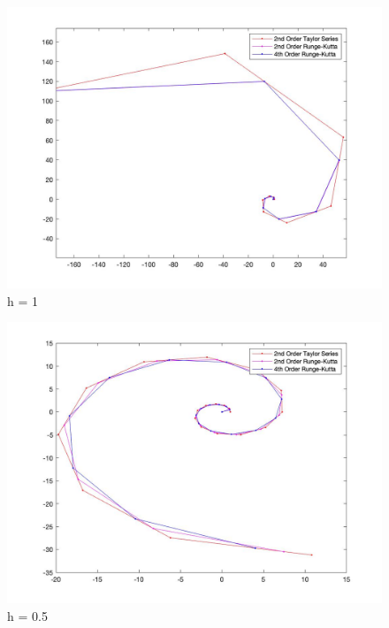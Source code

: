 \documentclass{article}
\begin{document}
\begin{figure}[H]
  \includegraphics[width=\linewidth]{docs/h1.jpg}
  \caption{h = 1}
\end{figure}

\begin{figure}[H]
  \includegraphics[width=\linewidth]{docs/05.jpg}
  \caption{h = 0.5}
\end{figure}
\end{document}
